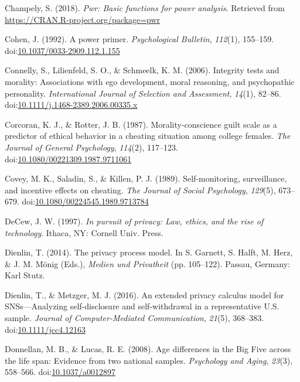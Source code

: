 \documentclass[man,floatsintext]{apa6}
\begin{document}
\leavevmode\hypertarget{ref-R-pwr}{}%
Champely, S. (2018). \emph{Pwr: Basic functions for power analysis}. Retrieved from \url{https://CRAN.R-project.org/package=pwr}

\leavevmode\hypertarget{ref-Cohen.1992}{}%
Cohen, J. (1992). A power primer. \emph{Psychological Bulletin}, \emph{112}(1), 155--159. doi:\href{https://doi.org/10.1037/0033-2909.112.1.155}{10.1037/0033-2909.112.1.155}

\leavevmode\hypertarget{ref-Connelly.2006}{}%
Connelly, S., Lilienfeld, S. O., \& Schmeelk, K. M. (2006). Integrity tests and morality: Associations with ego development, moral reasoning, and psychopathic personality. \emph{International Journal of Selection and Assessment}, \emph{14}(1), 82--86. doi:\href{https://doi.org/10.1111/j.1468-2389.2006.00335.x}{10.1111/j.1468-2389.2006.00335.x}

\leavevmode\hypertarget{ref-Corcoran.1987}{}%
Corcoran, K. J., \& Rotter, J. B. (1987). Morality-conscience guilt scale as a predictor of ethical behavior in a cheating situation among college females. \emph{The Journal of General Psychology}, \emph{114}(2), 117--123. doi:\href{https://doi.org/10.1080/00221309.1987.9711061}{10.1080/00221309.1987.9711061}

\leavevmode\hypertarget{ref-Covey.1989}{}%
Covey, M. K., Saladin, S., \& Killen, P. J. (1989). Self-monitoring, surveillance, and incentive effects on cheating. \emph{The Journal of Social Psychology}, \emph{129}(5), 673--679. doi:\href{https://doi.org/10.1080/00224545.1989.9713784}{10.1080/00224545.1989.9713784}

\leavevmode\hypertarget{ref-DeCew.1997}{}%
DeCew, J. W. (1997). \emph{In pursuit of privacy: Law, ethics, and the rise of technology}. Ithaca, NY: Cornell Univ. Press.

\leavevmode\hypertarget{ref-Dienlin.2014}{}%
Dienlin, T. (2014). The privacy process model. In S. Garnett, S. Halft, M. Herz, \& J. M. Mönig (Eds.), \emph{Medien und Privatheit} (pp. 105--122). Passau, Germany: Karl Stutz.

\leavevmode\hypertarget{ref-Dienlin.2016a}{}%
Dienlin, T., \& Metzger, M. J. (2016). An extended privacy calculus model for SNSs---Analyzing self-disclosure and self-withdrawal in a representative U.S. sample. \emph{Journal of Computer-Mediated Communication}, \emph{21}(5), 368--383. doi:\href{https://doi.org/10.1111/jcc4.12163}{10.1111/jcc4.12163}

\leavevmode\hypertarget{ref-Donnellan.2008}{}%
Donnellan, M. B., \& Lucas, R. E. (2008). Age differences in the Big Five across the life span: Evidence from two national samples. \emph{Psychology and Aging}, \emph{23}(3), 558--566. doi:\href{https://doi.org/10.1037/a0012897}{10.1037/a0012897}
\end{document}
